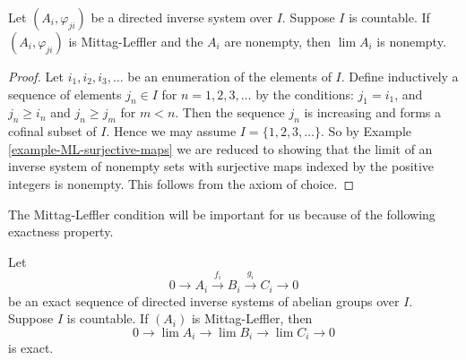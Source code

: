\begin{lemma}
\label{lemma-ML-limit-nonempty}
Let $(A_i, \varphi_{ji})$ be a directed inverse system over $I$.  Suppose $I$
is countable.  If $(A_i, \varphi_{ji})$ is Mittag-Leffler and the $A_i$ are
nonempty, then $\lim A_i$ is nonempty.
\end{lemma}

\begin{proof}
Let $i_1, i_2, i_3, \ldots$ be an enumeration of the elements of $I$.  Define
inductively a sequence of elements $j_n \in I$ for $n = 1, 2, 3, \ldots$ by the
conditions: $j_1 = i_1$, and $j_n \geq i_n$ and $j_n \geq j_m$ for $m < n$.
 Then the sequence $j_n$ is increasing and forms a cofinal subset of $I$.
Hence we may assume $I =\{1, 2, 3, \ldots \}$.  So by Example
\ref{example-ML-surjective-maps} we are reduced to showing that the limit of an
inverse system of nonempty sets with surjective maps indexed by the positive
integers is nonempty. This follows from the axiom of choice.
\end{proof}

\noindent
The Mittag-Leffler condition will be important for us because of the following
exactness property.

\begin{lemma}
\label{lemma-ML-exact-sequence}
Let
$$
0 \to A_i \xrightarrow{f_i} B_i \xrightarrow{g_i} C_i \to 0
$$
be an exact sequence of directed inverse systems of abelian groups over $I$.
Suppose $I$ is countable.  If $(A_i)$ is Mittag-Leffler, then
$$
0 \to \lim A_i \to \lim B_i \to \lim C_i\to 0
$$
is exact.
\end{lemma}

